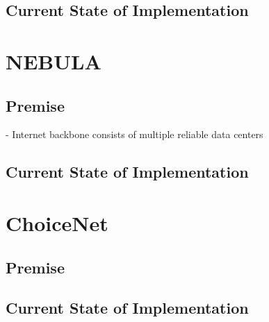 

        \subsection{Current State of Implementation}


    \section{NEBULA}
        \subsection{Premise}
            - Internet backbone consists of multiple reliable data centers

        \subsection{Current State of Implementation}

    \section{ChoiceNet}
        \subsection{Premise}
        \subsection{Current State of Implementation}

